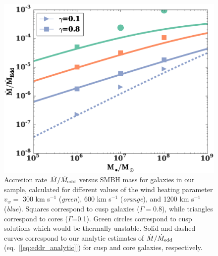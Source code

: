 \documentclass[usenatbib,fleqn]{mn2e}
\newcommand{\vwO}{v_{w}}
\begin{document}
\begin{figure}
  \includegraphics[width=\columnwidth]{mdot_mass.eps}
  \caption{\label{fig:mdot_mass} Accretion rate $\dot{M}/\dot{M}_{\rm
      edd}$ versus SMBH mass for galaxies in our sample, calculated
    for different values of the wind heating parameter $\vwO =$ 300 km
    s$^{-1}$ ({\it green}), 600 km s$^{-1}$ ({\it orange}), and 1200
    km s$^{-1}$ ({\it blue}).  Squares correspond to cusp galaxies
    ($\Gamma=0.8$), while triangles correspond to cores
    ($\Gamma$=0.1). Green circles correspond to cusp solutions which
    would be thermally unstable.  Solid and dashed curves correspond
    to our analytic estimates of $\dot{M}/\dot{M}_{\rm edd}$
    (eq.~[\ref{eq:eddr_analytic}]) for cusp and core galaxies,
    respectively. }
\end{figure}
\end{document}

